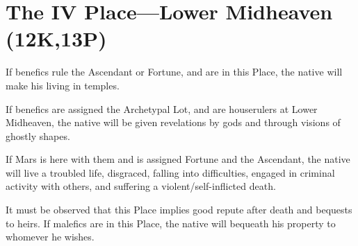 \section{The IV Place---Lower Midheaven (12K,13P)}

If benefics rule the Ascendant or Fortune, and are in this Place, the native will make his living in temples. 

If benefics are assigned the Archetypal Lot, and are houserulers at Lower Midheaven, the native will be given revelations by gods and through visions of ghostly shapes. 

If Mars is here with them and is assigned Fortune and the Ascendant, the native will live a troubled life, disgraced, falling into difficulties,
engaged in criminal activity with others, and suffering a violent/self-inflicted death.

It must be observed that this Place implies good repute after death and bequests to heirs. If malefics are in this Place, the native will bequeath his property to whomever he wishes.

\newpage